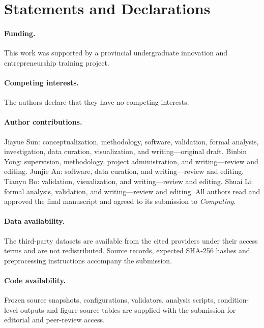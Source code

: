 \documentclass[smallextended]{svjour3}
\begin{document}
\section*{Statements and Declarations}
\paragraph{Funding.} This work was supported by a provincial undergraduate innovation and entrepreneurship training project.
\paragraph{Competing interests.} The authors declare that they have no competing interests.
\paragraph{Author contributions.} Jiayue Sun: conceptualization, methodology, software, validation, formal analysis, investigation, data curation, visualization, and writing---original draft. Binbin Yong: supervision, methodology, project administration, and writing---review and editing. Junjie An: software, data curation, and writing---review and editing. Tianyu Bo: validation, visualization, and writing---review and editing. Shuai Li: formal analysis, validation, and writing---review and editing. All authors read and approved the final manuscript and agreed to its submission to \textit{Computing}.
\paragraph{Data availability.} The third-party datasets are available from the cited providers under their access terms and are not redistributed. Source records, expected SHA-256 hashes and preprocessing instructions accompany the submission.
\paragraph{Code availability.} Frozen source snapshots, configurations, validators, analysis scripts, condition-level outputs and figure-source tables are supplied with the submission for editorial and peer-review access.

\end{document}
